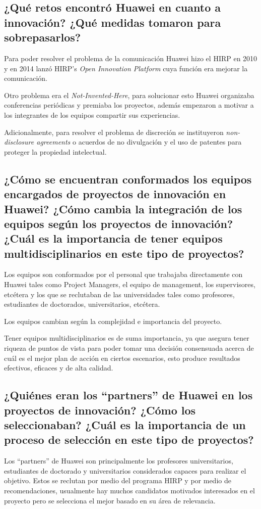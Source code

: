 \documentclass{article}
\begin{document}
\subsection{¿Qué retos encontró Huawei en cuanto a innovación? ¿Qué medidas tomaron para sobrepasarlos? }
Para poder resolver el problema de la comunicación Huawei hizo el HIRP en 2010 y en 2014 lanzó HIRP's \emph{Open Innovation Platform} cuya función era mejorar la comunicación. \par 
Otro problema era el \emph{Not-Invented-Here}, para solucionar esto Huawei organizaba conferencias periódicas y premiaba los proyectos, además empezaron a motivar a los integrantes de los equipos compartir sus experiencias. \par 
Adicionalmente, para resolver el problema de discreción se instituyeron \emph{non-disclosure agreements} o acuerdos de no divulgación y el uso de patentes para proteger la propiedad intelectual. 

\subsection{¿Cómo se encuentran conformados los equipos encargados de proyectos de innovación en Huawei? ¿Cómo cambia la integración de los equipos según los proyectos de innovación? ¿Cuál es la importancia de tener equipos multidisciplinarios en este tipo de proyectos? }

Los equipos son conformados por el personal que trabajaba directamente con Huawei tales como Project Managers, el equipo de management, los supervisores, etcétera y los que se reclutaban de las universidades tales como profesores, estudiantes de doctorados, universitarios, etcétera.

Los equipos cambian según la complejidad e importancia del proyecto. 

Tener equipos multidisciplinarios es de suma importancia, ya que asegura tener riqueza de puntos de vista para poder tomar una decisión consensuada acerca de cuál es el mejor plan de acción en ciertos escenarios, esto produce resultados efectivos, eficaces y de alta calidad.

\subsection{¿Quiénes eran los ``partners'' de Huawei en los proyectos de innovación? ¿Cómo los seleccionaban? ¿Cuál es la importancia de un proceso de selección en este tipo de proyectos? }
Los ``partners'' de Huawei son principalmente los profesores universitarios, estudiantes de doctorado y universitarios considerados capaces para realizar el objetivo. Estos se reclutan por medio del programa HIRP y por medio de recomendaciones, usualmente hay muchos candidatos motivados interesados en el proyecto pero se selecciona el mejor basado en su área de relevancia.



 

\end{document}
